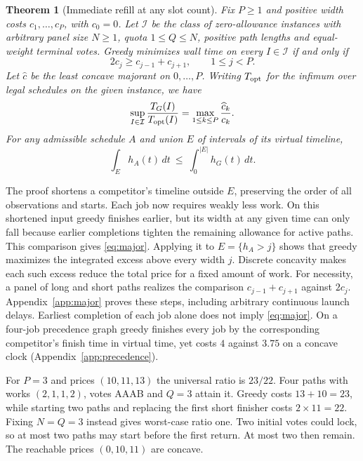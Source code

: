 \documentclass{article}
\newtheorem{theorem}{Theorem}
\begin{document}
\begin{theorem}[Immediate refill at any slot count]\label{th:occupancy}
Fix $P\ge1$ and positive width costs $c_1,\ldots,c_P$, with $c_0=0$. Let $\mathcal I$ be the class of zero-allowance instances with arbitrary panel size $N\ge1$, quota $1\le Q\le N$, positive path lengths and equal-weight terminal votes. Greedy minimizes wall time on every $I\in\mathcal I$ if and only if
\[
      2c_j\ge c_{j-1}+c_{j+1},\qquad 1\le j<P .
\]
Let $\widehat c$ be the least concave majorant on $0,\ldots,P$. Writing $T_{\rm opt}$ for the infimum over legal schedules on the given instance, we have
\[
  \sup_{I\in\mathcal I}\frac{T_G(I)}{T_{\rm opt}(I)}
            = \max_{1\le k\le P}\frac{\widehat c_k}{c_k} .
\]
For any admissible schedule $A$ and union $E$ of intervals of its virtual timeline,
\begin{equation}\label{eq:major}
       \int_E h_A(t)\,dt\ \le\ \int_0^{|E|} h_G(t)\,dt .
\end{equation}
\end{theorem}
The proof shortens a competitor's timeline outside $E$, preserving the order of all observations and starts. Each job now requires weakly less work. On this shortened input greedy finishes earlier, but its width at any given time can only fall because earlier completions tighten the remaining allowance for active paths. This comparison gives \eqref{eq:major}. Applying it to $E=\{h_A>j\}$ shows that greedy maximizes the integrated excess above every width $j$. Discrete concavity makes each such excess reduce the total price for a fixed amount of work. For necessity, a panel of long and short paths realizes the comparison $c_{j-1}+c_{j+1}$ against $2c_j$. Appendix~\ref{app:major} proves these steps, including arbitrary continuous launch delays. Earliest completion of each job alone does not imply \eqref{eq:major}. On a four-job precedence graph greedy finishes every job by the corresponding competitor's finish time in virtual time, yet costs $4$ against $3.75$ on a concave clock (Appendix~\ref{app:precedence}).

For $P=3$ and prices $(10,11,13)$ the universal ratio is $23/22$. Four paths with works $(2,1,1,2)$, votes AAAB and $Q=3$ attain it. Greedy costs $13+10=23$, while starting two paths and replacing the first short finisher costs $2\times11=22$. Fixing $N=Q=3$ instead gives worst-case ratio one. Two initial votes could lock, so at most two paths may start before the first return. At most two then remain. The reachable prices $(0,10,11)$ are concave.
\end{document}
